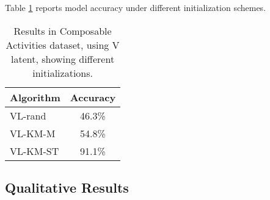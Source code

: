 Table \ref{tab:initialization} reports model accuracy under different initialization
schemes.

\begin{table}
\centering
\begin{tabular}{|l|c|}
\hline
\textbf{Algorithm} & \textbf{Accuracy}\\
\hline
VL-rand   & 46.3\% \\
VL-KM-M   & 54.8\% \\
VL-KM-ST   & 91.1\% \\
\hline
\end{tabular}
\caption{Results in Composable Activities dataset, using V latent, showing different initializations. }
\label{tab:initialization}
\end{table}


\subsection{Qualitative Results}

